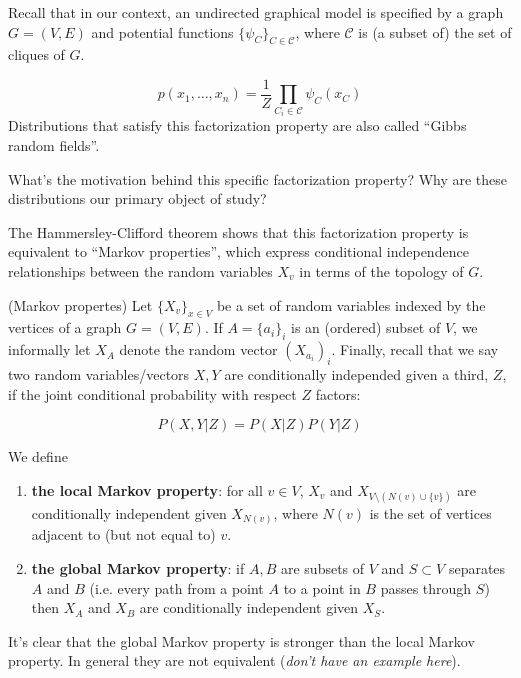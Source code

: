 Recall that in our context, an undirected graphical model is specified by a graph $G = (V, E)$ and potential functions $\{\psi_C\}_{C \in \mathcal{C}}$, where $\mathcal{C}$ is (a subset of) the set of cliques of $G$. 

\begin{equation} \label{eq:gibbsfield}
p(x_1, \ldots, x_n) = \frac{1}{Z} \prod_{C_i \in \mathcal{C}} \psi_C(x_C)
\end{equation}
Distributions that satisfy this factorization property are also called ``Gibbs random fields''. 

What's the motivation behind this specific factorization property? Why are these distributions our primary object of study?

The Hammersley-Clifford theorem shows that this factorization property is equivalent to  ``Markov properties'', which express conditional independence relationships between the random variables $X_v$ in terms of the topology of $G$.


\begin{definition} \label{def:props} (Markov propertes) Let $\{X_v\}_{x \in V}$ be a set of random variables indexed by the vertices of a graph $G = (V, E)$. If $A = \{a_i\}_i$ is an (ordered) subset of $V$, we informally let $X_A$ denote the random vector $(X_{a_i})_i$. Finally, recall that we say two random variables/vectors $X, Y$ are conditionally independed given a third, $Z$, if the joint conditional probability with respect $Z$ factors:

  $$P(X,Y|Z) = P(X|Z)P(Y|Z)$$
  
We define 
  \begin{enumerate}

  \item  \textbf{the local Markov property}: for all $v \in V$, $X_v$ and $X_{V \setminus (N(v) \cup \{v\})}$ are conditionally independent given $X_{N(v)}$, where $N(v)$ is the set of vertices adjacent to (but not equal to) $v$.
    
  \item \textbf{the global Markov property}: if $A, B$ are subsets of $V$ and $S \subset V$ separates $A$ and $B$ (i.e. every path from a point $A$ to a point in $B$ passes through $S$) then $X_A$ and $X_B$ are conditionally independent given $X_S$. 
  \end{enumerate}
\end{definition} \label{def:markovprop}
It's clear that the global Markov property is stronger than the local Markov property. In general they are not equivalent (\textit{don't have an example here}).


